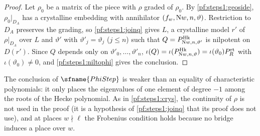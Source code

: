\begin{proof}
Let $\rho_0$ be a matrix of the piece with $\rho$ graded of $\rho_0$. By \cref{pf:steps1:geoside}, $\rho_0|_{D_A}$ has a crystalline embedding
with annihilator $(f_w,\mathrm{N}w,n,\vartheta)$. Restriction to $D_A$ preserves the grading, so \cref{pf:steps1:joinq} gives $L$, a
crystalline model $r'$ of $\rho|_{D_A}$ over $L$ and $\vartheta'$ with $\vartheta'_j=\vartheta_j$ ($j\le n$) such that
$Q=P^{\mathrm{Hk}}_{\mathrm{N}w,n,\vartheta'}$ is nilpotent on $D(r')$. Since $Q$ depends only on $\vartheta'_0,\dots,\vartheta'_n$,
$\iota(Q)=\iota(P^{\mathrm{Hk}}_{\mathrm{N}w,n,\vartheta})=\iota(\vartheta_0)P^{\mathrm{rt}}_R$ with $\iota(\vartheta_0)\ne0$, and
\cref{pf:steps1:niltophi} gives the conclusion.
\end{proof}

\begin{remark}
The conclusion of $\sfname{PhiStep}$ is weaker than an equality of characteristic polynomials: it only places the eigenvalues of one
element of degree $-1$ among the roots of the Hecke polynomial. As in \cref{pf:steps1:crys}, the continuity of $\rho$ is not used in the
proof (it is a hypothesis of \cref{pf:steps1:joinq} that its proof does not use), and at places $w\nmid\ell$ the Frobenius condition
holds because no bridge induces a place over $w$.
\end{remark}
